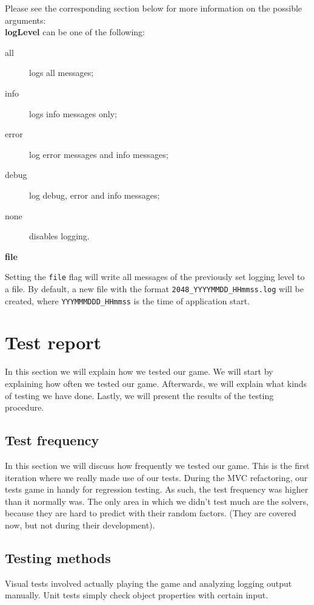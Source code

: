 \documentclass[a4paper,11pt,report]{scrartcl}
\begin{document}
Please see the corresponding section below for more information on the possible
arguments:\\

\textbf{logLevel} can be one of the following:
\begin{description}
	\item[all] logs all messages;
	\item[info] logs info messages only;
	\item[error] log error messages and info messages;
	\item[debug] log debug, error and info messages;
	\item[none] disables logging.
\end{description}

\textbf{file}

Setting the \texttt{file} flag will write all messages of the previously set
logging level to a file. By default, a new file with the format
\texttt{2048\_YYYYMMDD\_HHmmss.log} will be created, where
\texttt{YYYMMMDDD\_HHmmss} is the time of application start.

\newpage\section{Test report}

In this section we will explain how we tested our game. We will start by
explaining how often we tested our game. Afterwards, we will explain what
kinds of testing we have done. Lastly, we will present the results of the
testing procedure.

\subsection{Test frequency}
In this section we will discuss how frequently we tested our game. This is the
first iteration where we really made use of our tests. During the MVC
refactoring, our tests game in handy for regression testing. As such, the test
frequency was higher than it normally was. The only area in which we didn't test
much are the solvers, because they are hard to predict with their random
factors. (They are covered now, but not during their development).

\subsection{Testing methods}
Visual tests involved actually playing the game and analyzing logging output
manually. Unit tests simply check object properties with certain input.
\end{document}
